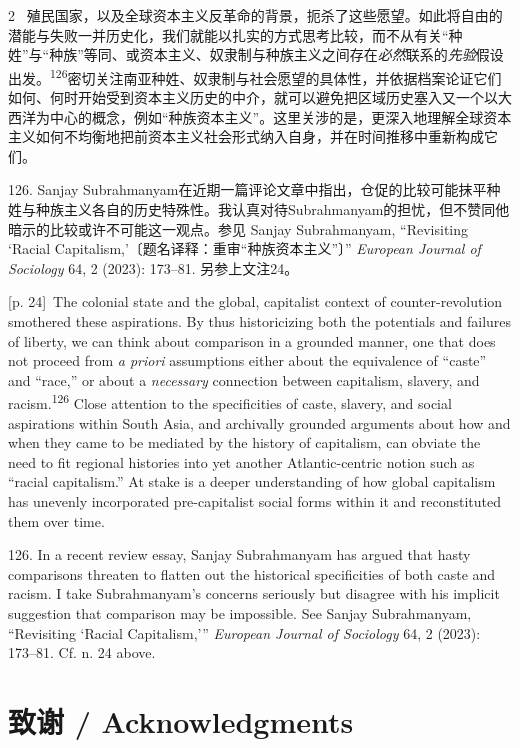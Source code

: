 \documentclass[10pt,a4paper]{article}
\begin{document}
\begin{paracol}{2}
\switchcolumn*
{\scriptsize\color{gray} [p. 24]}\ 殖民国家，以及全球资本主义反革命的背景，扼杀了这些愿望。如此将自由的潜能与失败一并历史化，我们就能以扎实的方式思考比较，而不从有关“种姓”与“种族”等同、或资本主义、奴隶制与种族主义之间存在\textit{必然}联系的\textit{先验}假设出\mbox{发。\textsuperscript{126}}密切关注南亚种姓、奴隶制与社会愿望的具体性，并依据档案论证它们如何、何时开始受到资本主义历史的中介，就可以避免把区域历史塞入又一个以大西洋为中心的概念，例如“种族资本主义”。这里关涉的是，更深入地理解全球资本主义如何不均衡地把前资本主义社会形式纳入自身，并在时间推移中重新构成它们。\par{\small 126. Sanjay Subrahmanyam在近期一篇评论文章中指出，仓促的比较可能抹平种姓与种族主义各自的历史特殊性。我认真对待Subrahmanyam的担忧，但不赞同他暗示的比较或许不可能这一观点。参见 Sanjay Subrahmanyam, “Revisiting ‘Racial Capitalism,’〔题名译释：重审“种族资本主义”〕” \textit{European Journal of Sociology} 64, 2 (2023): 173–81. 另参上文注24。\par}
\switchcolumn
{\scriptsize\color{gray} [p. 24]}\ The colonial state and the global, capitalist context of counter-revolution smothered these aspirations. By thus historicizing both the potentials and failures of liberty, we can think about comparison in a grounded manner, one that does not proceed from \textit{a priori} assumptions either about the equivalence of “caste” and “race,” or about a \textit{necessary} connection between capitalism, slavery, and racism.\nobreak\textsuperscript{126} Close attention to the specificities of caste, slavery, and social aspirations within South Asia, and archivally grounded arguments about how and when they came to be mediated by the history of capitalism, can obviate the need to fit regional histories into yet another Atlantic-centric notion such as “racial capitalism.” At stake is a deeper understanding of how global capitalism has unevenly incorporated pre-capitalist social forms within it and reconstituted them over time.\par{\small 126. In a recent review essay, Sanjay Subrahmanyam has argued that hasty comparisons threaten to flatten out the historical specificities of both caste and racism. I take Subrahmanyam’s concerns seriously but disagree with his implicit suggestion that comparison may be impossible. See Sanjay Subrahmanyam, “Revisiting ‘Racial Capitalism,’” \textit{European Journal of Sociology} 64, 2 (2023): 173–81. Cf. n. 24 above.\par}
\switchcolumn*
\end{paracol}
\section*{致谢 / Acknowledgments}
\end{document}
